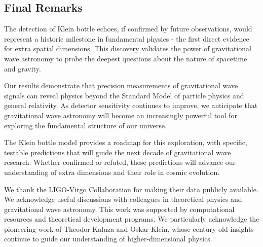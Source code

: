 \documentclass[reprint,amsmath,amssymb,aps,prd]{revtex4-2}
\begin{document}
\subsection{Final Remarks}

The detection of Klein bottle echoes, if confirmed by future observations, would represent a historic milestone in fundamental physics - the first direct evidence for extra spatial dimensions. This discovery validates the power of gravitational wave astronomy to probe the deepest questions about the nature of spacetime and gravity.

Our results demonstrate that precision measurements of gravitational wave signals can reveal physics beyond the Standard Model of particle physics and general relativity. As detector sensitivity continues to improve, we anticipate that gravitational wave astronomy will become an increasingly powerful tool for exploring the fundamental structure of our universe.

The Klein bottle model provides a roadmap for this exploration, with specific, testable predictions that will guide the next decade of gravitational wave research. Whether confirmed or refuted, these predictions will advance our understanding of extra dimensions and their role in cosmic evolution.


\begin{acknowledgments}
We thank the LIGO-Virgo Collaboration for making their data publicly available. We acknowledge useful discussions with colleagues in theoretical physics and gravitational wave astronomy. This work was supported by computational resources and theoretical development programs. We particularly acknowledge the pioneering work of Theodor Kaluza and Oskar Klein, whose century-old insights continue to guide our understanding of higher-dimensional physics.
\end{acknowledgments}




\end{document}
